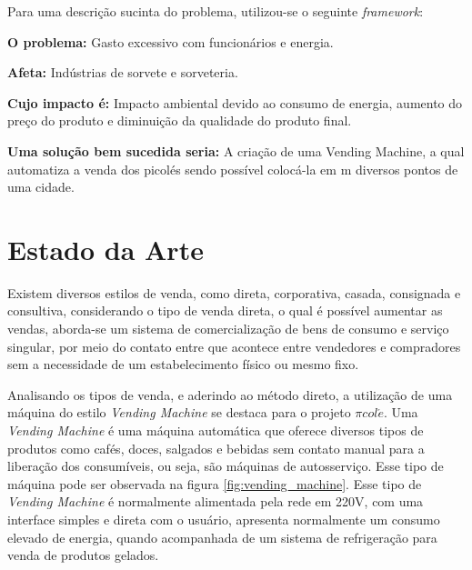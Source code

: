 Para uma descrição sucinta do problema, utilizou-se o seguinte \textit{framework}:

\textbf{O problema:} Gasto excessivo com funcionários e energia.

\textbf{Afeta:} Indústrias de sorvete e sorveteria.

\textbf{Cujo impacto é:} Impacto ambiental devido ao consumo de energia, aumento do preço do produto e diminuição da qualidade do produto final.

\textbf{Uma solução bem sucedida seria:} A criação de uma Vending Machine, a qual automatiza a venda dos picolés sendo possível colocá-la em m diversos pontos de uma cidade.

\section{Estado da Arte}

Existem diversos estilos de venda, como direta, corporativa, casada, consignada e consultiva, considerando o tipo de venda direta, o qual é possível aumentar as vendas, aborda-se um sistema de comercialização de bens de consumo e serviço singular, por meio do contato entre que acontece entre vendedores e compradores sem a necessidade de um estabelecimento físico ou mesmo fixo. \cite {MARQUES} 

Analisando os tipos de venda, e aderindo ao método direto, a utilização de uma máquina do estilo \textit{Vending Machine} se destaca para o projeto $\pi col\acute{e}$. Uma  \textit{Vending Machine} é uma máquina automática que oferece diversos tipos de produtos como cafés, doces, salgados e bebidas sem contato manual para a liberação dos consumíveis, ou seja, são máquinas de autosserviço. Esse tipo de máquina pode ser observada na figura \ref{fig:vending_machine}.
	Esse tipo de\textit{ Vending Machine} é normalmente alimentada pela rede em 220V, com uma interface simples e direta com o usuário, apresenta normalmente um consumo elevado de energia, quando acompanhada de um sistema de refrigeração para venda de produtos gelados.

